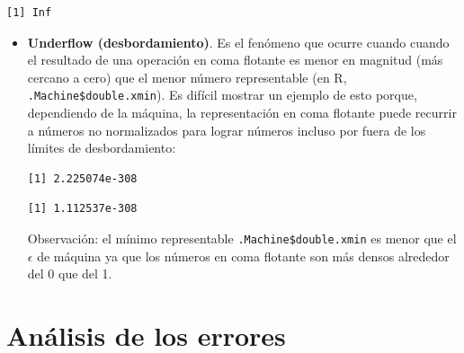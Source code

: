 \documentclass[openany]{book}
\newenvironment{Shaded}{\begin{snugshade}}{\end{snugshade}}
\newcommand{\CommentTok}[1]{\textcolor[rgb]{0.56,0.35,0.01}{\textit{#1}}}
\newcommand{\DecValTok}[1]{\textcolor[rgb]{0.00,0.00,0.81}{#1}}
\newcommand{\NormalTok}[1]{#1}
\newcommand{\OperatorTok}[1]{\textcolor[rgb]{0.81,0.36,0.00}{\textbf{#1}}}
\newcommand{\StringTok}[1]{\textcolor[rgb]{0.31,0.60,0.02}{#1}}
\begin{document}
\begin{verbatim}
[1] Inf
\end{verbatim}

\begin{itemize}
\item
  \textbf{Underflow (desbordamiento)}. Es el fenómeno que ocurre cuando cuando el resultado de una operación en coma flotante es menor en magnitud (más cercano a cero) que el menor número representable (en R, \texttt{.Machine\$double.xmin}). Es difícil mostrar un ejemplo de esto porque, dependiendo de la máquina, la representación en coma flotante puede recurrir a números no normalizados para lograr números incluso por fuera de los límites de desbordamiento:

\begin{Shaded}
\end{Shaded}

\begin{verbatim}
[1] 2.225074e-308
\end{verbatim}

\begin{Shaded}
\end{Shaded}

\begin{verbatim}
[1] 1.112537e-308
\end{verbatim}

  Observación: el mínimo representable \texttt{.Machine\$double.xmin} es menor que el \(\epsilon\) de máquina ya que los números en coma flotante son más densos alrededor del 0 que del 1.
\end{itemize}

\hypertarget{anuxe1lisis-de-los-errores}{%
\section{Análisis de los errores}\label{anuxe1lisis-de-los-errores}}
\end{document}
